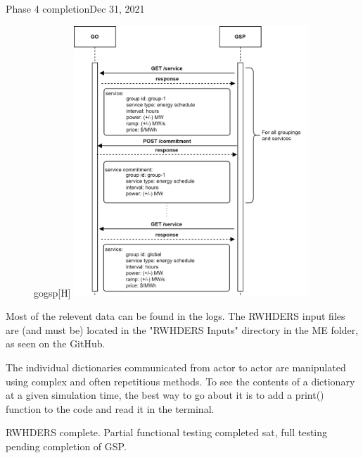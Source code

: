 \begin{entry}{Phase 4 completion}{Dec 31, 2021}
    \data

    \begin{figure}{gogsp}[H]
        \centering
        \includegraphics[height=4in]{Fall2021/Figures/goGspcomms}
        \label{fig:gogsp}
    \end{figure}

    Most of the relevent data can be found in the logs. The RWHDERS input files are (and must be) located in the
    "RWHDERS Inputs" directory in the ME folder, as seen on the GitHub.

    The individual dictionaries communicated from actor to actor are manipulated using complex and often repetitious
    methods. To see the contents of a dictionary at a given simulation time, the best way to go about it is to add
    a print() function to the code and read it in the terminal.

    \results
    
    RWHDERS complete. Partial functional testing completed sat, full testing pending completion of GSP.


\end{entry}


